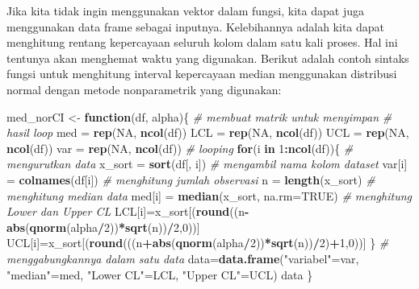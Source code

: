 \documentclass[]{book}
\newenvironment{Shaded}{\begin{snugshade}}{\end{snugshade}}
\newcommand{\KeywordTok}[1]{\textcolor[rgb]{0.13,0.29,0.53}{\textbf{#1}}}
\newcommand{\DataTypeTok}[1]{\textcolor[rgb]{0.13,0.29,0.53}{#1}}
\newcommand{\DecValTok}[1]{\textcolor[rgb]{0.00,0.00,0.81}{#1}}
\newcommand{\StringTok}[1]{\textcolor[rgb]{0.31,0.60,0.02}{#1}}
\newcommand{\CommentTok}[1]{\textcolor[rgb]{0.56,0.35,0.01}{\textit{#1}}}
\newcommand{\OtherTok}[1]{\textcolor[rgb]{0.56,0.35,0.01}{#1}}
\newcommand{\ControlFlowTok}[1]{\textcolor[rgb]{0.13,0.29,0.53}{\textbf{#1}}}
\newcommand{\OperatorTok}[1]{\textcolor[rgb]{0.81,0.36,0.00}{\textbf{#1}}}
\newcommand{\NormalTok}[1]{#1}
\begin{document}
Jika kita tidak ingin menggunakan vektor dalam fungsi, kita dapat juga
menggunakan data frame sebagai inputnya. Kelebihannya adalah kita dapat
menghitung rentang kepercayaan seluruh kolom dalam satu kali proses. Hal
ini tentunya akan menghemat waktu yang digunakan. Berikut adalah contoh
sintaks fungsi untuk menghitung interval kepercayaan median menggunakan
distribusi normal dengan metode nonparametrik yang digunakan:

\begin{Shaded}
\begin{Highlighting}[]
\NormalTok{med_norCI <-}\StringTok{ }\ControlFlowTok{function}\NormalTok{(df, alpha)\{}
  \CommentTok{# membuat matrik untuk menyimpan}
  \CommentTok{# hasil loop}
\NormalTok{  med =}\StringTok{ }\KeywordTok{rep}\NormalTok{(}\OtherTok{NA}\NormalTok{, }\KeywordTok{ncol}\NormalTok{(df))}
\NormalTok{  LCL =}\StringTok{ }\KeywordTok{rep}\NormalTok{(}\OtherTok{NA}\NormalTok{, }\KeywordTok{ncol}\NormalTok{(df))}
\NormalTok{  UCL =}\StringTok{ }\KeywordTok{rep}\NormalTok{(}\OtherTok{NA}\NormalTok{, }\KeywordTok{ncol}\NormalTok{(df))}
\NormalTok{  var =}\StringTok{ }\KeywordTok{rep}\NormalTok{(}\OtherTok{NA}\NormalTok{, }\KeywordTok{ncol}\NormalTok{(df))}
  \CommentTok{# looping}
  \ControlFlowTok{for}\NormalTok{(i }\ControlFlowTok{in} \DecValTok{1}\OperatorTok{:}\KeywordTok{ncol}\NormalTok{(df))\{}
    \CommentTok{# mengurutkan data}
\NormalTok{    x_sort =}\StringTok{ }\KeywordTok{sort}\NormalTok{(df[, i])}
    \CommentTok{# mengambil nama kolom dataset}
\NormalTok{    var[i] =}\StringTok{ }\KeywordTok{colnames}\NormalTok{(df[i])}
    \CommentTok{# menghitung jumlah observasi}
\NormalTok{    n =}\StringTok{ }\KeywordTok{length}\NormalTok{(x_sort)}
    \CommentTok{# menghitung median data}
\NormalTok{    med[i] =}\StringTok{ }\KeywordTok{median}\NormalTok{(x_sort, }\DataTypeTok{na.rm=}\OtherTok{TRUE}\NormalTok{)}
    \CommentTok{# menghitung Lower dan Upper CL}
\NormalTok{    LCL[i]=x_sort[(}\KeywordTok{round}\NormalTok{((n}\OperatorTok{-}\KeywordTok{abs}\NormalTok{(}\KeywordTok{qnorm}\NormalTok{(alpha}\OperatorTok{/}\DecValTok{2}\NormalTok{))}\OperatorTok{*}\KeywordTok{sqrt}\NormalTok{(n))}\OperatorTok{/}\DecValTok{2}\NormalTok{,}\DecValTok{0}\NormalTok{))]}
\NormalTok{    UCL[i]=x_sort[(}\KeywordTok{round}\NormalTok{(((n}\OperatorTok{+}\KeywordTok{abs}\NormalTok{(}\KeywordTok{qnorm}\NormalTok{(alpha}\OperatorTok{/}\DecValTok{2}\NormalTok{))}\OperatorTok{*}\KeywordTok{sqrt}\NormalTok{(n))}\OperatorTok{/}\DecValTok{2}\NormalTok{)}\OperatorTok{+}\DecValTok{1}\NormalTok{,}\DecValTok{0}\NormalTok{))]}
\NormalTok{  \}}
  \CommentTok{# menggabungkannya dalam satu data}
\NormalTok{  data=}\KeywordTok{data.frame}\NormalTok{(}\StringTok{"variabel"}\NormalTok{=var,}
                  \StringTok{"median"}\NormalTok{=med,}
                  \StringTok{"Lower CL"}\NormalTok{=LCL,}
                  \StringTok{"Upper CL"}\NormalTok{=UCL)}
\NormalTok{  data}
\NormalTok{\}}
\end{Highlighting}
\end{Shaded}
\end{document}
